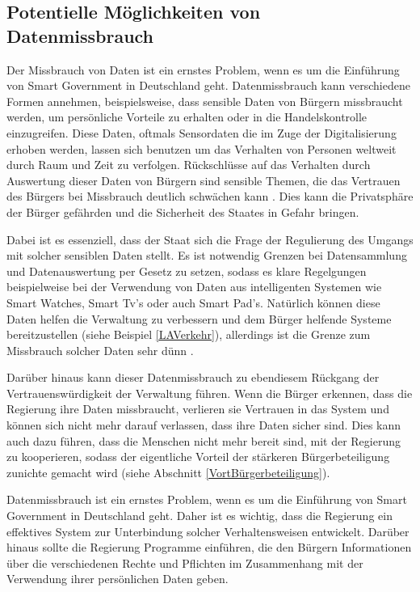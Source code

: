 \subsection{Potentielle Möglichkeiten von Datenmissbrauch}
Der Missbrauch von Daten ist ein ernstes Problem, wenn es um die Einführung von Smart Government in Deutschland geht.
Datenmissbrauch kann verschiedene Formen annehmen, beispielsweise, dass sensible Daten von Bürgern missbraucht werden, um persönliche Vorteile zu erhalten oder in die Handelskontrolle einzugreifen.
Diese Daten, oftmals Sensordaten die im Zuge der Digitalisierung erhoben werden, lassen sich benutzen um das Verhalten von Personen weltweit durch Raum und Zeit zu verfolgen.
Rückschlüsse auf das Verhalten durch Auswertung dieser Daten von Bürgern sind sensible Themen, die das Vertrauen des Bürgers bei Missbrauch deutlich schwächen kann \citep[Vgl.][S.179]{von_Lucke_2016}.
Dies kann die Privatsphäre der Bürger gefährden und die Sicherheit des Staates in Gefahr bringen.
\par
Dabei ist es essenziell, dass der Staat sich die Frage der Regulierung des Umgangs mit solcher sensiblen Daten stellt.
Es ist notwendig Grenzen bei Datensammlung und Datenauswertung  per Gesetz zu setzen, sodass es klare Regelgungen beispielweise bei der Verwendung von Daten aus intelligenten Systemen wie Smart Watches, Smart Tv's oder auch Smart Pad's.
Natürlich können diese Daten helfen die Verwaltung zu verbessern und dem Bürger helfende Systeme bereitzustellen (siehe Beispiel \ref{LAVerkehr}), allerdings ist die Grenze zum Missbrauch solcher Daten sehr dünn \citep[Vgl.][S. 39]{Lucke2016}.
\par
Darüber hinaus kann dieser Datenmissbrauch zu ebendiesem Rückgang der Vertrauenswürdigkeit der Verwaltung führen.
Wenn die Bürger erkennen, dass die Regierung ihre Daten missbraucht, verlieren sie Vertrauen in das System und können sich nicht mehr darauf verlassen, dass ihre Daten sicher sind.
Dies kann auch dazu führen, dass die Menschen nicht mehr bereit sind, mit der Regierung zu kooperieren, sodass der eigentliche Vorteil der stärkeren Bürgerbeteiligung zunichte gemacht wird (siehe Abschnitt \ref{VortBürgerbeteiligung}).
\par
Datenmissbrauch ist ein ernstes Problem, wenn es um die Einführung von Smart Government in Deutschland geht.
Daher ist es wichtig, dass die Regierung ein effektives System zur Unterbindung solcher Verhaltensweisen entwickelt.
Darüber hinaus sollte die Regierung Programme einführen, die den Bürgern Informationen über die verschiedenen Rechte und Pflichten im Zusammenhang mit der Verwendung ihrer persönlichen Daten geben.